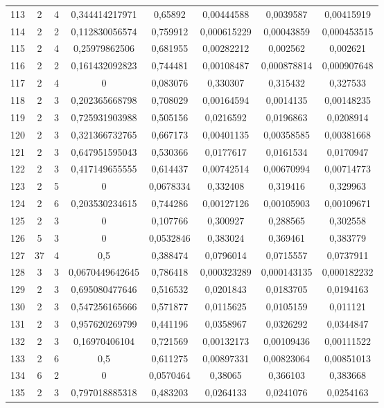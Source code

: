 \begin{longtable}{|c|c|c|c|c|c|c|c|}
113 & 2 & 4 & 0,344414217971 & 0,65892 & 0,00444588 & 0,0039587 & 0,00415919  \\
114 & 2 & 2 & 0,112830056574 & 0,759912 & 0,000615229 & 0,00043859 & 0,000453515  \\
115 & 2 & 4 & 0,25979862506 & 0,681955 & 0,00282212 & 0,002562 & 0,002621  \\
116 & 2 & 2 & 0,161432092823 & 0,744481 & 0,00108487 & 0,000878814 & 0,000907648  \\
117 & 2 & 4 & 0 & 0,083076 & 0,330307 & 0,315432 & 0,327533  \\
118 & 2 & 3 & 0,202365668798 & 0,708029 & 0,00164594 & 0,0014135 & 0,00148235  \\
119 & 2 & 3 & 0,725931903988 & 0,505156 & 0,0216592 & 0,0196863 & 0,0208914  \\
120 & 2 & 3 & 0,321366732765 & 0,667173 & 0,00401135 & 0,00358585 & 0,00381668  \\
121 & 2 & 3 & 0,647951595043 & 0,530366 & 0,0177617 & 0,0161534 & 0,0170947  \\
122 & 2 & 3 & 0,417149655555 & 0,614437 & 0,00742514 & 0,00670994 & 0,00714773  \\
123 & 2 & 5 & 0 & 0,0678334 & 0,332408 & 0,319416 & 0,329963  \\
124 & 2 & 6 & 0,203530234615 & 0,744286 & 0,00127126 & 0,00105903 & 0,00109671  \\
125 & 2 & 3 & 0 & 0,107766 & 0,300927 & 0,288565 & 0,302558  \\
126 & 5 & 3 & 0 & 0,0532846 & 0,383024 & 0,369461 & 0,383779  \\
127 & 37 & 4 & 0,5 & 0,388474 & 0,0796014 & 0,0715557 & 0,0737911  \\
128 & 3 & 3 & 0,0670449642645 & 0,786418 & 0,000323289 & 0,000143135 & 0,000182232  \\
129 & 2 & 3 & 0,695080477646 & 0,516532 & 0,0201843 & 0,0183705 & 0,0194163  \\
130 & 2 & 3 & 0,547256165666 & 0,571877 & 0,0115625 & 0,0105159 & 0,011121  \\
131 & 2 & 3 & 0,957620269799 & 0,441196 & 0,0358967 & 0,0326292 & 0,0344847  \\
132 & 2 & 3 & 0,16970406104 & 0,721569 & 0,00132173 & 0,00109436 & 0,00111522  \\
133 & 2 & 6 & 0,5 & 0,611275 & 0,00897331 & 0,00823064 & 0,00851013  \\
134 & 6 & 2 & 0 & 0,0570464 & 0,38065 & 0,366103 & 0,383668  \\
135 & 2 & 3 & 0,797018885318 & 0,483203 & 0,0264133 & 0,0241076 & 0,0254163  \\

\end{longtable}
